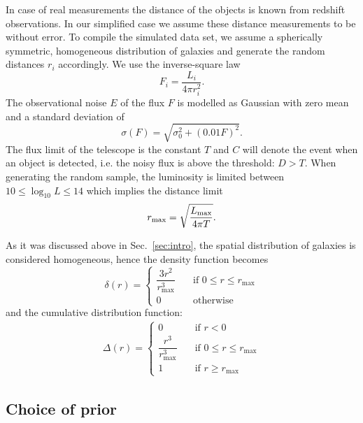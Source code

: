 In case of real measurements the distance of the objects is known from redshift observations.
In our simplified case we assume these distance measurements to be without error.
To compile the simulated data set, we assume a spherically symmetric, homogeneous distribution of galaxies and generate the random distances $r_i$ accordingly.
We use the inverse-square law
\begin{equation}
F_i = \frac{L_i}{4 \pi r_i^2}.
\end{equation}
The observational noise $E$ of the flux $F$ is modelled as Gaussian with zero mean and a standard deviation of
\begin{equation}
\sigma(F)=\sqrt{\sigma_{0}^2+(0.01F)^2}.
\label{eq:error}
\end{equation}
The flux limit of the telescope is the constant $T$ and $C$ will denote the event when an object is detected, i.e. the noisy flux is above the threshold: $D > T$.
When generating the random sample, the luminosity is limited between $10 \leq \log_{10}{L} \leq 14$ which implies the distance limit
\begin{equation}
r_\textnormal{max} = \sqrt{\frac{L_\textnormal{max}}{4 \pi T}}.
\end{equation}

As it was discussed above in Sec.~\ref{sec:intro}, the spatial distribution of galaxies is considered homogeneous, hence the density function becomes \begin{equation}\label{eq:dist_dens_func} \delta(r)= \begin{cases} \dfrac{3r^{2}}{r_{\max}^{3}} & \quad \text{if } 0\leq r\leq r_{\max}\\ 0 & \quad \text{otherwise} \end{cases} \end{equation} and the cumulative distribution function: \begin{align}\label{eq:dist_cum_func} \Delta(r)= \begin{cases} 0 & \quad \text{if } r<0\\ \dfrac{r^{3}}{r_{\max}^{3}} & \quad \text{if } 0\leq r\leq r_{\max}\\ 1 & \quad \text{if } r\geq r_{\max} \end{cases} \end{align}


\subsection{Choice of prior}

